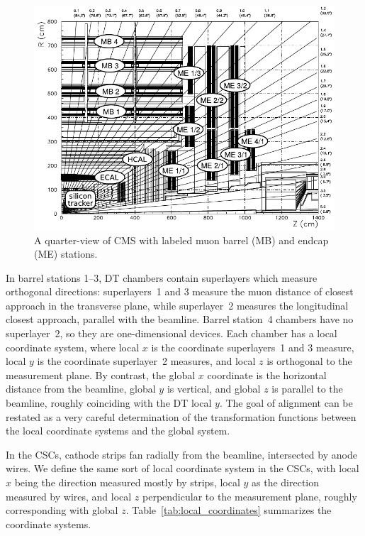 \documentclass[12pt]{article}
\begin{document}
\begin{figure}
\hspace{-1.3 cm} \includegraphics[width=1.2\linewidth]{muon_system_labeled.pdf}

\caption{A quarter-view of CMS with labeled muon barrel (MB) and endcap (ME) stations. \label{fig:muon_system_labeled}}
\end{figure}

In barrel stations 1--3, DT chambers contain superlayers which measure
orthogonal directions: superlayers~1 and 3 measure the muon distance
of closest approach in the transverse plane, while superlayer~2
measures the longitudinal closest approach, parallel with the
beamline.  Barrel station~4 chambers have no superlayer~2, so they are
one-dimensional devices.  Each chamber has a local coordinate system,
where local $x$ is the coordinate superlayers~1 and 3 measure, local
$y$ is the coordinate superlayer~2 measures, and local $z$ is
orthogonal to the measurement plane.  By contrast, the global $x$
coordinate is the horizontal distance from the beamline, global $y$ is
vertical, and global $z$ is parallel to the beamline, roughly
coinciding with the DT local $y$.  The goal of alignment can be
restated as a very careful determination of the transformation
functions between the local coordinate systems and the global system.

In the CSCs, cathode strips fan radially from the beamline,
intersected by anode wires.  We define the same sort of local
coordinate system in the CSCs, with local $x$ being the direction
measured mostly by strips, local $y$ as the direction measured by
wires, and local $z$ perpendicular to the measurement plane, roughly
corresponding with global $z$.  Table~\ref{tab:local_coordinates}
summarizes the coordinate systems.
\end{document}
